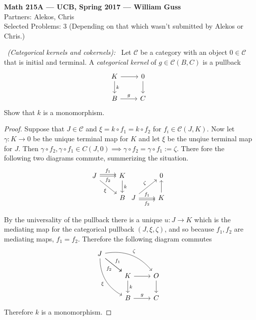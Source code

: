 \documentclass[11pt]{amsart}
\theoremstyle{definition}
\numberwithin{theorem}{section}
\numberwithin{definition}{section}
\numberwithin{equation}{section}
\def\scriptc{{\mathcal C}}
\begin{document}
\begin{center}{\bf Math 215A --- UCB, Spring 2017 --- William Guss} \\
Partners: Alekos, Chris \\
Selected Problems: 3 (Depending on that which wasn't submitted by Alekos or Chris.)
\end{center}


\medskip {}\ \emph{(Categorical kernels and cokernels):} \ Let $\scriptc$ be a category with an object $0\in \scriptc$ that is initial and terminal. A \emph{categorical kernel} of $g \in \scriptc(B,C)$ is a pullback
\begin{equation*}
	\begin{tikzcd}
		K \arrow{r}{} \arrow{d}{k} & 0 \arrow{d}{} \\
		B \arrow{r}{g} & C
	\end{tikzcd}
\end{equation*}
Show that $k$ is a monomorphism.
\begin{proof}
	Suppose that $J \in \scriptc$ and $\xi = k \circ f_1 = k \circ f_2$ for $f_i \in \scriptc(J, K)$. 
	Now let $\gamma: K \to 0$ be the unique terminal map for $K$ and let $\xi$ be the unqiue terminal map for $J.$ Then $\gamma \circ f_2, \gamma \circ f_1 \in C(J, 0) \implies \gamma \circ f_2 = \gamma \circ f_1 := \zeta$.
	There fore the following two diagrams commute, summerizing the situation.
	\begin{equation*}
			\begin{tikzcd}
			J \arrow[r,shift left, "f_1"] 
			\arrow[r, swap, "f_2"] 
			\arrow[rd, swap,"\xi"] & K \arrow[d, "k"] \\
			& B
		\end{tikzcd}
		\begin{tikzcd}
			& 0\\ 
			J \arrow[r, "f_1"] 
			\arrow[r,  shift right, swap, "f_2"] 
			\arrow[ru,"\zeta"] & K \arrow[u]
		\end{tikzcd}
	\end{equation*}

	By the universality of the pullback there is a unique $u: J \to K$ which is the mediating map for the categorical pullback $(J, \xi, \zeta)$, and so because $f_1, f_2$ are mediating maps, $f_1 = f_2.$ Therefore the following diagram commutes
	\begin{equation*}
		 \begin{tikzcd}
		 	J \arrow[rrd, bend left, "\zeta"] \arrow[rd, "f_1"] \arrow[rd, swap, "f_2"] \arrow[rdd,swap, bend right,  "\xi"] \\
		 	& K \arrow[r] \arrow[d, "k"] & O \arrow[d] \\
		 	& B \arrow[r, "g"] & C
		 \end{tikzcd}
	 \end{equation*} 
	 Therefore  $k$ is a monomorphism.
\end{proof}
\end{document}
